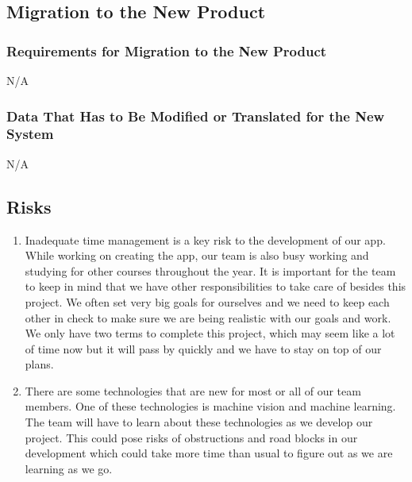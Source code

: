 \documentclass[12pt,letterpaper]{article}
\begin{document}
\subsection{Migration to the New Product}

\subsubsection{Requirements for Migration to the New Product}
N/A

\subsubsection{Data That Has to Be Modified or Translated for the New System}
N/A

\subsection{Risks}
\begin{enumerate}
    \item Inadequate time management is a key risk to the development of our app. While working on creating the app, our team is also busy working and studying for other courses throughout the year. It is important for the team to keep in mind that we have other responsibilities to take care of besides this project. We often set very big goals for ourselves and we need to keep each other in check to make sure we are being realistic with our goals and work. We only have two terms to complete this project, which may seem like a lot of time now but it will pass by quickly and we have to stay on top of our plans.
    
    \item There are some technologies that are new for most or all of our team members. One of these technologies is machine vision and machine learning. The team will have to learn about these technologies as we develop our project. This could pose risks of obstructions and road blocks in our development which could take more time than usual to figure out as we are learning as we go.
\end{enumerate}
\end{document}
